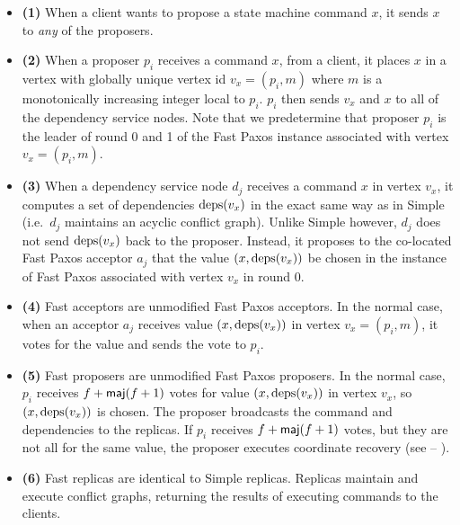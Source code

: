 \begin{itemize}
  \item \textbf{(1)}
    When a client wants to propose a state machine command $x$, it sends $x$ to
    \emph{any} of the proposers.

  \item \textbf{(2)}
    When a proposer $p_i$ receives a command $x$, from a client, it places $x$
    in a vertex with globally unique vertex id $v_x = (p_i, m)$ where $m$ is a
    monotonically increasing integer local to $p_i$. $p_i$ then sends $v_x$ and
    $x$ to all of the dependency service nodes. Note that we predetermine
    that proposer $p_i$ is the leader of round 0 and 1 of the Fast Paxos
    instance associated with vertex $v_x = (p_i, m)$.

  \item \textbf{(3)}
    When a dependency service node $d_j$ receives a command $x$ in vertex
    $v_x$, it computes a set of dependencies $\text{deps}(v_x)$ in the exact same way
    as in Simple \BPaxos{} (i.e.\ $d_j$ maintains an acyclic conflict graph).
    Unlike Simple \BPaxos{} however, $d_j$ does not send $\text{deps}(v_x)$ back to
    the proposer. Instead, it proposes to the co-located Fast Paxos acceptor
    $a_j$ that the value $(x, \text{deps}(v_x))$ be chosen in the instance of Fast
    Paxos associated with vertex $v_x$ in round 0.

  \item \textbf{(4)}
    Fast \BPaxos{} acceptors are unmodified Fast Paxos acceptors. In the
    normal case, when an acceptor $a_j$ receives value $(x, \text{deps}(v_x))$ in
    vertex $v_x = (p_i, m)$, it votes for the value and sends the vote to
    $p_i$.

  \item \textbf{(5)}
    Fast \BPaxos{} proposers are unmodified Fast Paxos proposers. In the
    normal case, $p_i$ receives $f + \textsf{maj}(f+1)$ votes for value $(x,
    \text{deps}(v_x))$ in vertex $v_x$, so $(x, \text{deps}(v_x))$ is chosen. The proposer
    broadcasts the command and dependencies to the replicas.
    If $p_i$ receives $f + \textsf{maj}(f+1)$ votes, but they are not all for the same
    value, the proposer executes coordinate recovery (see
      --
    ).

  \item \textbf{(6)}
    Fast \BPaxos{} replicas are identical to Simple \BPaxos{} replicas.
    Replicas maintain and execute conflict graphs, returning the results of
    executing commands to the clients.
\end{itemize}


